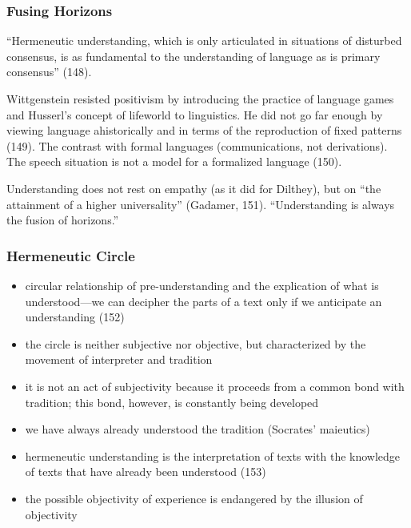 \documentclass[xcolor=dvipsnames]{beamer}
\begin{document}
\begin{frame}
  \frametitle{Fusing Horizons}
  ``Hermeneutic understanding, which is only articulated in situations
  of disturbed consensus, is as fundamental to the understanding of
  language as is primary consensus'' (148).

\bigskip

Wittgenstein resisted positivism by introducing the practice of
language games and Husserl's concept of lifeworld to linguistics. He
did not go far enough by viewing language ahistorically and in terms
of the reproduction of fixed patterns (149). The contrast with formal
languages (communications, not derivations). The speech situation is
not a model for a formalized language (150).

\bigskip

  Understanding does not rest on empathy (as it did for Dilthey), but
  on ``the attainment of a higher universality'' (Gadamer, 151).
  ``Understanding is always the fusion of horizons.'' 
\end{frame}

\begin{frame}
  \frametitle{Hermeneutic Circle}
  \begin{itemize}
  \item circular relationship of pre-understanding and the explication
    of what is understood---we can decipher the parts of a text only
    if we anticipate an understanding (152)
  \item the circle is neither subjective nor objective, but
    characterized by the movement of interpreter and tradition
  \item it is not an act of subjectivity because it proceeds from a
    common bond with tradition; this bond, however, is constantly
    being developed
  \item we have always already understood the tradition (Socrates'
    maieutics)
  \item hermeneutic understanding is the interpretation of texts with
    the knowledge of texts that have already been understood (153)
  \item the possible objectivity of experience is endangered by the
    illusion of objectivity
  \end{itemize}
\end{frame}
\end{document}

